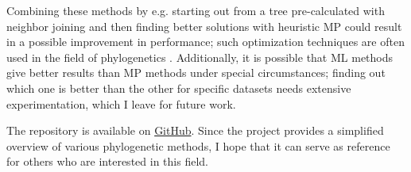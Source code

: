 \documentclass[11pt,twocolumn]{article}
\begin{document}
Combining these methods by e.g. starting out from a tree pre-calculated with neighbor joining and then finding better solutions with heuristic MP could result in a possible improvement in performance; such optimization techniques are often used in the field of phylogenetics \cite{Zvelebil2007}. Additionally, it is possible that ML methods give better results than MP methods under special circumstances; finding out which one is better than the other for specific datasets needs extensive experimentation, which I leave for future work.

The repository is available on \href{https://github.com/Leena01/computational_biology}{GitHub}. Since the project provides a simplified overview of various phylogenetic methods, I hope that it can serve as reference for others who are interested in this field.

\newpage


\end{document}
